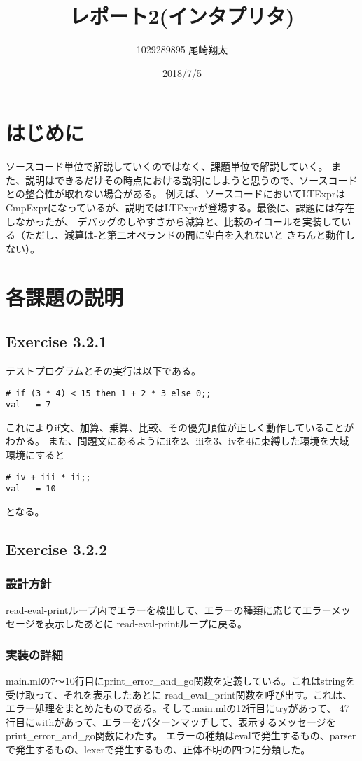 \documentclass{jarticle}
\begin{document}
\title{レポート2(インタプリタ)}
\author{1029289895 尾崎翔太}
\date{2018/7/5}

\maketitle

\section{はじめに}
ソースコード単位で解説していくのではなく、課題単位で解説していく。
また、説明はできるだけその時点における説明にしようと思うので、ソースコードとの整合性が取れない場合がある。
例えば、ソースコードにおいてLTExprはCmpExprになっているが、説明ではLTExprが登場する。最後に、課題には存在しなかったが、
デバッグのしやすさから減算と、比較のイコールを実装している（ただし、減算は-と第二オペランドの間に空白を入れないと
きちんと動作しない）。

\section{各課題の説明}
\subsection{Exercise 3.2.1}
テストプログラムとその実行は以下である。
\begin{lstlisting}[basicstyle=\ttfamily\footnotesize, frame=single]
# if (3 * 4) < 15 then 1 + 2 * 3 else 0;;
val - = 7
\end{lstlisting}
これによりif文、加算、乗算、比較、その優先順位が正しく動作していることがわかる。
また、問題文にあるようにiiを2、iiiを3、ivを4に束縛した環境を大域環境にすると
\begin{lstlisting}[basicstyle=\ttfamily\footnotesize, frame=single]
# iv + iii * ii;;
val - = 10
\end{lstlisting}
となる。

\subsection{Exercise 3.2.2}
\subsubsection{設計方針}
read-eval-printループ内でエラーを検出して、エラーの種類に応じてエラーメッセージを表示したあとに
read-eval-printループに戻る。

\subsubsection{実装の詳細}
main.mlの7〜10行目にprint\_error\_and\_go関数を定義している。これはstringを受け取って、それを表示したあとに
read\_eval\_print関数を呼び出す。これは、エラー処理をまとめたものである。そしてmain.mlの12行目にtryがあって、
47行目にwithがあって、エラーをパターンマッチして、表示するメッセージをprint\_error\_and\_go関数にわたす。
エラーの種類はevalで発生するもの、parserで発生するもの、lexerで発生するもの、正体不明の四つに分類した。
\end{document}
